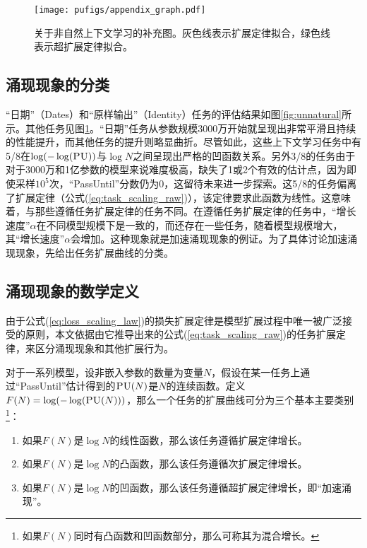 \begin{figure}[!htbp]
        \centering
        \texttt{[image: pufigs/appendix\_graph.pdf]}
    \caption{{关于非自然上下文学习的补充图。灰色线表示扩展定律拟合，绿色线表示超扩展定律拟合。}}
    \label{fig:appendix_unnatural}
\end{figure}

\subsection{涌现现象的分类}
“日期”（Dates）和“原样输出”（Identity）任务的评估结果如图\ref{fig:unnatural}所示。其他任务见图\ref{fig:appendix_unnatural}。“日期”任务从参数规模3000万开始就呈现出非常平滑且持续的性能提升，而其他任务的提升则略显曲折。尽管如此，这些上下文学习任务中有5/8在\(\log(-\log(\textsc{PU}))\)与\(\log N\)之间呈现出严格的凹函数关系。另外3/8的任务由于对于3000万和1亿参数的模型来说难度极高，缺失了1或2个有效的估计点，因为即使采样\(10^5\)次，“PassUntil”分数仍为0，这留待未来进一步探索。这5/8的任务偏离了扩展定律（公式(\ref{eq:task_scaling_raw})），该定律要求此函数为线性。这意味着，与那些遵循任务扩展定律的任务不同。在遵循任务扩展定律的任务中，“增长速度”\(\alpha\)在不同模型规模下是一致的，而还存在一些任务，随着模型规模增大，其“增长速度”\(\alpha\)会增加。这种现象就是加速涌现现象的例证。为了具体讨论加速涌现现象，先给出任务扩展曲线的分类。

\subsection{涌现现象的数学定义}
由于公式(\ref{eq:loss_scaling_law})的损失扩展定律是模型扩展过程中唯一被广泛接受的原则，本文依据由它推导出来的公式(\ref{eq:task_scaling_raw})的任务扩展定律，来区分涌现现象和其他扩展行为。


对于一系列模型，设非嵌入参数的数量为变量\(N\)，假设在某一任务上通过“PassUntil”估计得到的\(\textsc{PU}(N)\)是\(N\)的连续函数。定义\(F(N) = \operatorname{log}(-\operatorname{log}(\textsc{PU}(N)))\)，{那么一个任务的扩展曲线可分为三个基本主要类别\footnote{如果\(F(N)\)同时有凸函数和凹函数部分，那么可称其为混合增长。}：}
\begin{enumerate}
    \item 如果\(F(N)\)是\(\operatorname{log}N\)的线性函数，那么该任务遵循扩展定律增长。
    \item 如果\(F(N)\)是\(\operatorname{log}N\)的凸函数，那么该任务遵循次扩展定律增长。
    \item 如果\(F(N)\)是\(\operatorname{log}N\)的凹函数，那么该任务遵循超扩展定律增长，即“加速涌现”。
\end{enumerate}


